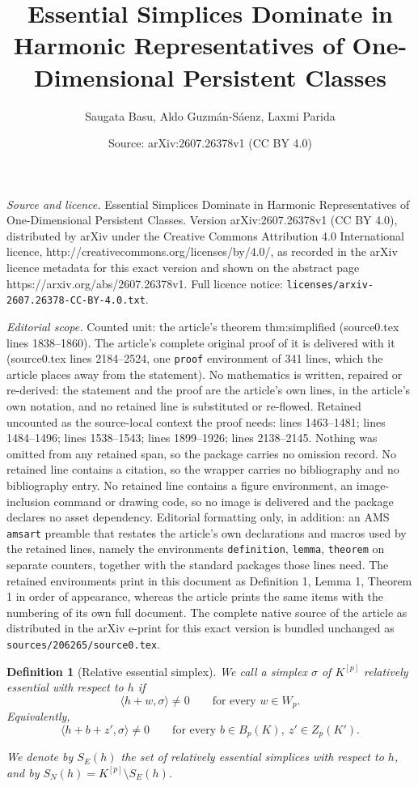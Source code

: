 \documentclass[10pt,a4paper]{amsart}
\title{Essential Simplices Dominate in Harmonic Representatives of One-Dimensional Persistent Classes}
\author{Saugata Basu, Aldo Guzm\'an-S\'aenz, Laxmi Parida}
\date{Source: arXiv:2607.26378v1 (CC BY 4.0)}
\newtheorem{definition}{Definition}
\begin{document}
\maketitle

\noindent\emph{Source and licence.} Essential Simplices Dominate in Harmonic Representatives of One-Dimensional Persistent Classes. Version arXiv:2607.26378v1 (CC BY 4.0), distributed by arXiv under the Creative Commons Attribution 4.0 International licence, http://creativecommons.org/licenses/by/4.0/, as recorded in the arXiv licence metadata for this exact version and shown on the abstract page https://arxiv.org/abs/2607.26378v1. Full licence notice: \texttt{licenses/arxiv-2607.26378-CC-BY-4.0.txt}.\par\smallskip

\noindent\textit{Editorial scope.} Counted unit: the article's theorem thm:simplified (source0.tex lines 1838--1860). The article's complete original proof of it is delivered with it (source0.tex lines 2184--2524, one \texttt{proof} environment of 341 lines, which the article places away from the statement). No mathematics is written, repaired or re-derived: the statement and the proof are the article's own lines, in the article's own notation, and no retained line is substituted or re-flowed.  Retained uncounted as the source-local context the proof needs: lines 1463--1481; lines 1484--1496; lines 1538--1543; lines 1899--1926; lines 2138--2145.  Nothing was omitted from any retained span, so the package carries no omission record.  No retained line contains a citation, so the wrapper carries no bibliography and no bibliography entry.  No retained line contains a figure environment, an image-inclusion command or drawing code, so no image is delivered and the package declares no asset dependency.  Editorial formatting only, in addition: an AMS \texttt{amsart} preamble that restates the article's own declarations and macros used by the retained lines, namely the environments \texttt{definition}, \texttt{lemma}, \texttt{theorem} on separate counters, together with the standard packages those lines need.  The retained environments print in this document as Definition 1, Lemma 1, Theorem 1 in order of appearance, whereas the article prints the same items with the numbering of its own full document.  The complete native source of the article as distributed in the arXiv e-print for this exact version is bundled unchanged as \texttt{sources/206265/source0.tex}.
\begin{definition}[Relative essential simplex]
\label{def:relative-essential}
We call a simplex \(\sigma\) of \(K^{[p]}\) \emph{relatively essential}
with respect to \(h\) if
\[
\langle h+w,\sigma\rangle\neq 0
\qquad
\text{for every }w\in W_p.
\]
Equivalently,
\[
\langle h+b+z',\sigma\rangle\neq 0
\qquad
\text{for every }b\in B_p(K),\ z'\in Z_p(K').
\]

We denote by  \(S_E(h)\)  the set of relatively essential simplices with respect to $h$, and by
\(S_N(h) = K^{[p]} \setminus S_E(h)\). 
\end{definition}
\end{document}

